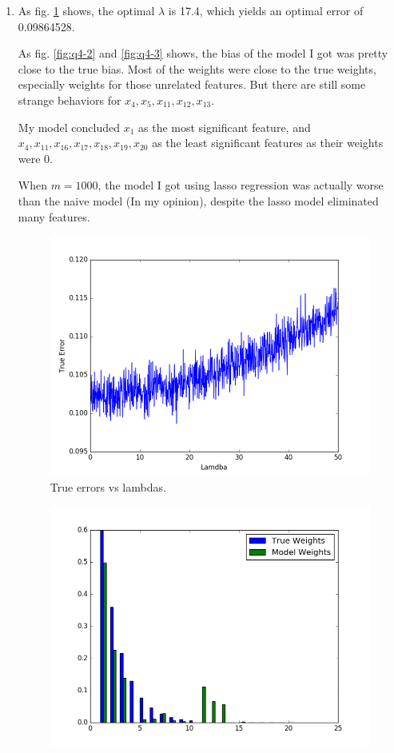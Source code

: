 \documentclass[letter, 12pt]{article}
\begin{document}
\begin{enumerate}
    	\item {}
    	\par{As fig. \ref{fig:q4-1} shows, the optimal $ \lambda $ is 17.4, which yields an optimal error of 0.09864528.}
    	\par{As fig. \ref{fig:q4-2} and \ref{fig:q4-3} shows, the bias of the model I got was pretty close to the true bias. Most of the weights were close to the true weights, especially weights for those unrelated features. But there are still some strange behaviors for $ x_4, x_5, x_{11}, x_{12}, x_{13} $.}
    	\par{My model concluded $ x_1 $ as the most significant feature, and $ x_4, x_{11}, x_{16}, x_{17}, x_{18}, x_{19}, x_{20} $ as the least significant features as their weights were 0. }
    	\par{When $ m = 1000 $, the model I got using lasso regression was actually worse than the naive model (In my opinion), despite the lasso model eliminated many features.}
    	\begin{figure}[H]
    		\centering
    		\centering
    		\includegraphics[width=0.7\linewidth]{q4-1.png}
    		\caption{True errors vs lambdas.}
    		\label{fig:q4-1}
    	\end{figure}
    	\begin{figure}[H]
    		\centering
    		\begin{minipage}{.48\textwidth}
    			\centering
    			\includegraphics[width=\linewidth]{q4-2.png}

\end{minipage}
\end{figure}
\end{enumerate}
\end{document}
